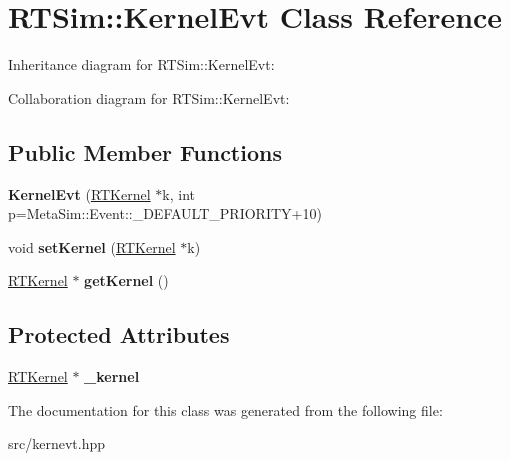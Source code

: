 \hypertarget{classRTSim_1_1KernelEvt}{}\section{R\+T\+Sim\+:\+:Kernel\+Evt Class Reference}
\label{classRTSim_1_1KernelEvt}


Inheritance diagram for R\+T\+Sim\+:\+:Kernel\+Evt\+:


Collaboration diagram for R\+T\+Sim\+:\+:Kernel\+Evt\+:
\subsection*{Public Member Functions}
\begin{DoxyCompactItemize}
\item 
{\bfseries Kernel\+Evt} (\hyperlink{classRTSim_1_1RTKernel}{R\+T\+Kernel} $\ast$k, int p=Meta\+Sim\+::\+Event\+::\+\_\+\+D\+E\+F\+A\+U\+L\+T\+\_\+\+P\+R\+I\+O\+R\+I\+TY+10)\hypertarget{classRTSim_1_1KernelEvt_a37e43d7b4a67e85256f2c9276b604e90}{}\label{classRTSim_1_1KernelEvt_a37e43d7b4a67e85256f2c9276b604e90}

\item 
void {\bfseries set\+Kernel} (\hyperlink{classRTSim_1_1RTKernel}{R\+T\+Kernel} $\ast$k)\hypertarget{classRTSim_1_1KernelEvt_a7325dfc1468e0eda9da2cb25a1be3b43}{}\label{classRTSim_1_1KernelEvt_a7325dfc1468e0eda9da2cb25a1be3b43}

\item 
\hyperlink{classRTSim_1_1RTKernel}{R\+T\+Kernel} $\ast$ {\bfseries get\+Kernel} ()\hypertarget{classRTSim_1_1KernelEvt_adbb64717864c3d331d98c68638511649}{}\label{classRTSim_1_1KernelEvt_adbb64717864c3d331d98c68638511649}

\end{DoxyCompactItemize}
\subsection*{Protected Attributes}
\begin{DoxyCompactItemize}
\item 
\hyperlink{classRTSim_1_1RTKernel}{R\+T\+Kernel} $\ast$ {\bfseries \+\_\+kernel}\hypertarget{classRTSim_1_1KernelEvt_a0470307d62774dd97d40b59f7b9bbfbb}{}\label{classRTSim_1_1KernelEvt_a0470307d62774dd97d40b59f7b9bbfbb}

\end{DoxyCompactItemize}


The documentation for this class was generated from the following file\+:\begin{DoxyCompactItemize}
\item 
src/kernevt.\+hpp\end{DoxyCompactItemize}
